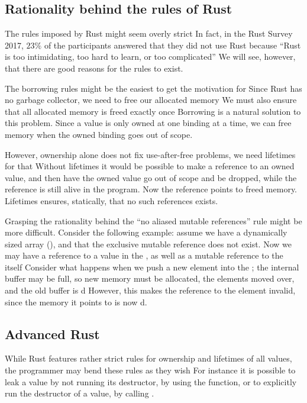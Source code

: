 \documentclass[b5paper]{report}
\begin{document}

\subsection{Rationality behind the rules of Rust}
The rules imposed by Rust might seem overly strict In fact, in the Rust
Survey 2017, $23\%$ of the participants answered that they did not use Rust
because ``Rust is too intimidating, too hard to learn, or too
complicated''\cite{rustsurvey2017} We will see, however, that there are good
reasons for the rules to exist.

The borrowing rules might be the easiest to get the motivation for Since Rust
has no garbage collector, we need to free our allocated memory We must also
ensure that all allocated memory is freed exactly once Borrowing is a natural
solution to this problem. Since a value is only owned at one binding at a time,
we can free memory when the owned binding goes out of scope.

However, ownership alone does not fix use-after-free problems, we need
lifetimes for that Without lifetimes it would be possible to make a reference
to an owned value, and then have the owned value go out of scope and be
dropped, while the reference is still alive in the program. Now the reference
points to freed memory. Lifetimes ensures, statically, that no such references
exists.

Grasping the rationality behind the ``no aliased mutable references'' rule
might be more difficult. Consider the following example: assume we have a
dynamically sized array (), and that the exclusive mutable reference
does not exist. Now we may have a reference to a value in the , as
well as a mutable reference to the  itself Consider what happens
when we push a new element into the ; the internal buffer may be
full, so new memory must be allocated, the elements moved over, and the old
buffer is d However, this makes the reference to the element
invalid, since the memory it points to is now d.

\subsection{Advanced Rust}
While Rust features rather strict rules for ownership and lifetimes of all
values, the programmer may bend these rules as they wish For instance it is
possible to leak a value by not running its destructor, by using the
 function, or to explicitly run the destructor of a
value, by calling .
\end{document}
